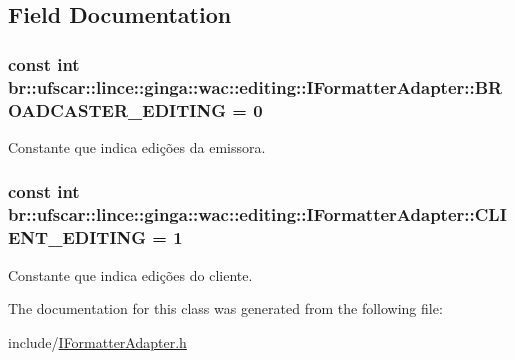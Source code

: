 \subsection{Field Documentation}
\hypertarget{classbr_1_1ufscar_1_1lince_1_1ginga_1_1wac_1_1editing_1_1IFormatterAdapter_a60586f9a11e5cefcfecef9386c28d4bd}{
\subsubsection[{BROADCASTER\_\-EDITING}]{\setlength{\rightskip}{0pt plus 5cm}const int {\bf br::ufscar::lince::ginga::wac::editing::IFormatterAdapter::BROADCASTER\_\-EDITING} = 0}}
\label{classbr_1_1ufscar_1_1lince_1_1ginga_1_1wac_1_1editing_1_1IFormatterAdapter_a60586f9a11e5cefcfecef9386c28d4bd}


Constante que indica edições da emissora. 

\hypertarget{classbr_1_1ufscar_1_1lince_1_1ginga_1_1wac_1_1editing_1_1IFormatterAdapter_a48e3735d7a1ade76f2f741592b5b097e}{
\subsubsection[{CLIENT\_\-EDITING}]{\setlength{\rightskip}{0pt plus 5cm}const int {\bf br::ufscar::lince::ginga::wac::editing::IFormatterAdapter::CLIENT\_\-EDITING} = 1}}
\label{classbr_1_1ufscar_1_1lince_1_1ginga_1_1wac_1_1editing_1_1IFormatterAdapter_a48e3735d7a1ade76f2f741592b5b097e}


Constante que indica edições do cliente. 



The documentation for this class was generated from the following file:\begin{DoxyCompactItemize}
\item 
include/\hyperlink{IFormatterAdapter_8h}{IFormatterAdapter.h}\end{DoxyCompactItemize}

